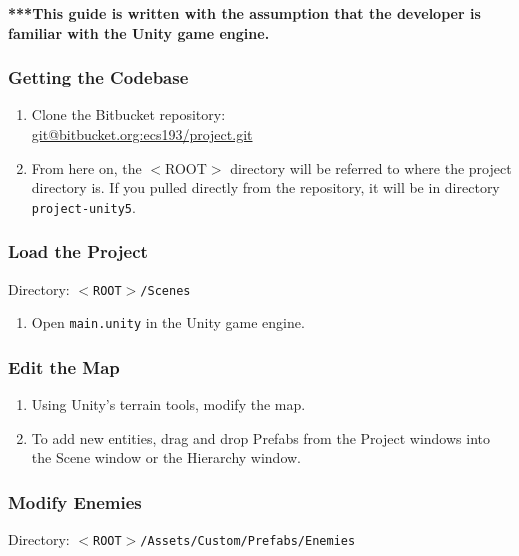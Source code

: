 \documentclass[a4paper]{refart}
\begin{document}
\textbf{***This guide is written with the assumption that the developer is familiar with the Unity game engine.}

\subsubsection{Getting the Codebase}

\begin{enumerate}
	\item Clone the Bitbucket repository:\\ \url{git@bitbucket.org:ecs193/project.git}
	\item From here on, the $<$ROOT$>$ directory will be referred to where the project directory is. If you pulled directly from the repository, it will be in directory \texttt{project-unity5}.
\end{enumerate}

\subsubsection{Load the Project}

Directory: \texttt{$<$ROOT$>$/Scenes}

\begin{enumerate}
	\item Open \texttt{main.unity} in the Unity game engine.
\end{enumerate}

\subsubsection{Edit the Map}

\begin{enumerate}
	\item Using Unity's terrain tools, modify the map.
	\item To add new entities, drag and drop Prefabs from the Project windows into the Scene window or the Hierarchy window.
\end{enumerate}

\subsubsection{Modify Enemies}

Directory: \texttt{$<$ROOT$>$/Assets/Custom/Prefabs/Enemies}
\end{document}
